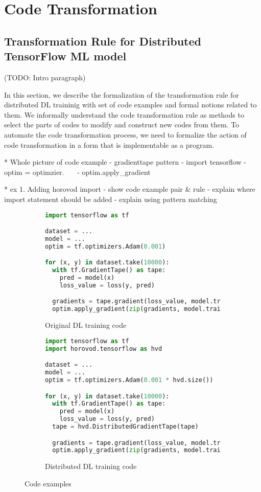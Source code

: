 \section{Code Transformation}\label{sec:trans}
\subsection{Transformation Rule for Distributed TensorFlow ML model}

(TODO: Intro paragraph)

In this section, we describe the formalization of the transformation rule
for distributed DL traininig with set of code examples and formal notions
related to them.
We informally understand the code transformation rule as methods to
select the parts of codes to modify and construct new codes from them.
To automate the code transformation process, we need to formalize the
action of code transformation in a form that is implementable as a program. 

* Whole picture of code example
  - gradienttape pattern
  - import tensorflow
  - optim = optimzier.~~~
  - optim.apply\_gradient  

* ex 1. Adding horovod import
  - show code example pair & rule
  - explain where import statement should be added 
  - explain using pattern matching  


\begin{figure}[ht!]
  \centering
  \begin{subfigure}[t]{0.48\textwidth}
    \begin{lstlisting}[language=Python]
import tensorflow as tf

dataset = ...
model = ...
optim = tf.optimizers.Adam(0.001) 

for (x, y) in dataset.take(10000):
  with tf.GradientTape() as tape:
    pred = model(x)
    loss_value = loss(y, pred) 

  gradients = tape.gradient(loss_value, model.trainable_variables)
  optim.apply_gradient(zip(gradients, model.trainable_variable)\end{lstlisting}
    \caption{Original DL training code}
  \end{subfigure}
  \hspace{5mm}
  \begin{subfigure}[t]{0.48\textwidth}
    \begin{lstlisting}[language=Python]
import tensorflow as tf
import horovod.tensorflow as hvd

dataset = ...
model = ...
optim = tf.optimizers.Adam(0.001 * hvd.size()) 

for (x, y) in dataset.take(10000):
  with tf.GradientTape() as tape:
    pred = model(x)
    loss_value = loss(y, pred) 
  tape = hvd.DistributedGradientTape(tape)

  gradients = tape.gradient(loss_value, model.trainable_variables)
  optim.apply_gradient(zip(gradients, model.trainable_variable)\end{lstlisting}
    \caption{Distributed DL training code}
  \end{subfigure}
  \label{fig:trans:ex}
  \caption{Code examples}
\end{figure}

